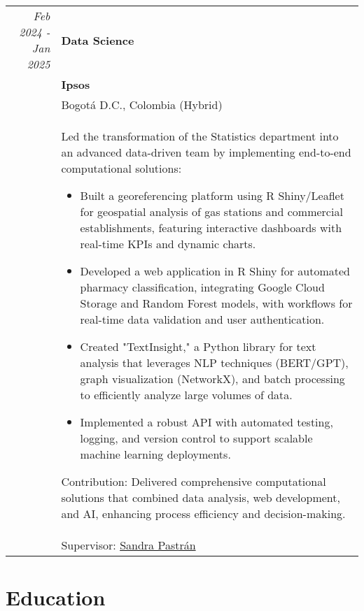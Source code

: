 \documentclass[a4paper,10pt]{article} %
\begin{document}
\begin{tabular}{r|p{11cm}}
\\
\emph{Feb 2024 - Jan 2025} & \textbf{Data Science} \\
& \textbf{Ipsos} \\
& Bogotá D.C., Colombia (Hybrid) \\
& \footnotesize{
Led the transformation of the Statistics department into an advanced data-driven team by implementing end-to-end computational solutions:
\begin{itemize}
    \item Built a georeferencing platform using R Shiny/Leaflet for geospatial analysis of gas stations and commercial establishments, featuring interactive dashboards with real-time KPIs and dynamic charts.
    \item Developed a web application in R Shiny for automated pharmacy classification, integrating Google Cloud Storage and Random Forest models, with workflows for real-time data validation and user authentication.
    \item Created "TextInsight," a Python library for text analysis that leverages NLP techniques (BERT/GPT), graph visualization (NetworkX), and batch processing to efficiently analyze large volumes of data.
    \item Implemented a robust API with automated testing, logging, and version control to support scalable machine learning deployments.
\end{itemize}
Contribution: Delivered comprehensive computational solutions that combined data analysis, web development, and AI, enhancing process efficiency and decision-making.
} \\
& Supervisor: \href{mailto:sandra.pastran@ipsos.com}{Sandra Pastrán} \\
\end{tabular}


\vspace{1em}
\section{Education}
\end{document}
